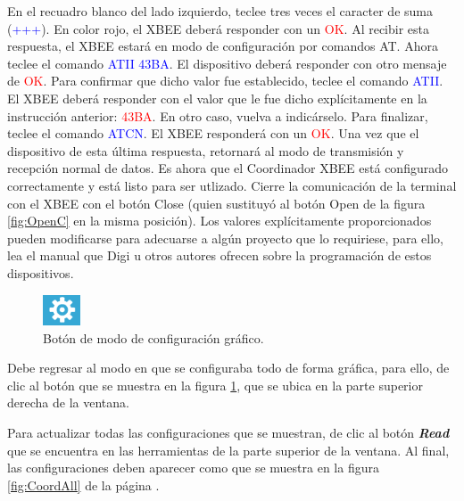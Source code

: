 En el recuadro blanco del lado izquierdo, teclee tres veces el caracter de suma (\textcolor{blue}{+++}). En color rojo, el XBEE deberá responder con un \textcolor{red}{OK}. Al recibir esta respuesta, el XBEE estará en modo de configuración por comandos AT\footnotemark. Ahora teclee el comando \textcolor{blue}{ATII 43BA}. El dispositivo deberá responder con otro mensaje de \textcolor{red}{OK}. Para confirmar que dicho valor fue establecido, teclee el comando \textcolor{blue}{ATII}. El XBEE deberá responder con el valor que le fue dicho explícitamente en la instrucción anterior: \textcolor{red}{43BA}. En otro caso, vuelva a indicárselo. Para finalizar, teclee el comando \textcolor{blue}{ATCN}. El XBEE responderá con un \textcolor{red}{OK}. Una vez que el dispositivo de esta última respuesta, retornará al modo de transmisión y recepción normal de datos. Es ahora que el Coordinador XBEE está configurado correctamente y está listo para ser utlizado. Cierre la comunicación de la terminal con el XBEE con el botón Close (quien sustituyó al botón Open de la figura \ref{fig:OpenC} en la misma posición). Los valores explícitamente proporcionados pueden modificarse para adecuarse a algún proyecto que lo requiriese, para ello, lea el manual que Digi u otros autores ofrecen sobre la programación de estos dispositivos.

\begin{figure} %
    \centering
    \includegraphics[width=0.10\textwidth]{Figures/XCTU/ConfMode}
    \caption{Botón de modo de configuración gráfico.}
    \label{fig:ConMode}
\end{figure}

Debe regresar al modo en que se configuraba todo de forma gráfica, para ello, de clic al botón que se muestra en la figura \ref{fig:ConMode}, que se ubica en la parte superior derecha de la ventana.

Para actualizar todas las configuraciones que se muestran, de clic al botón \textit{\textbf{Read}} que se encuentra en las herramientas de la parte superior de la ventana. Al final, las configuraciones deben aparecer como que se muestra en la figura \ref{fig:CoordAll} de la página \pageref{fig:CoordAll}.


